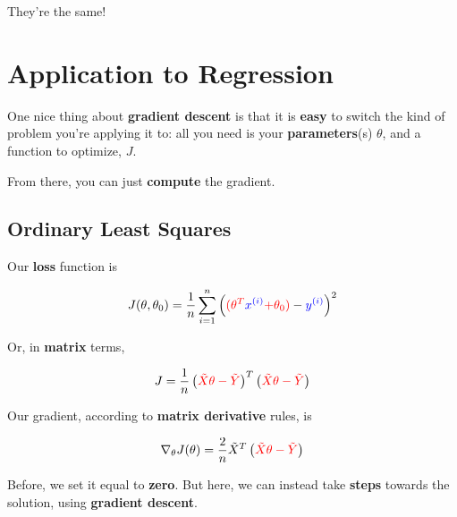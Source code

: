         They're the same!

        

\pagebreak
\section{Application to Regression}
    
    One nice thing about \textbf{gradient descent} is that it is \textbf{easy} to switch the kind of problem you're applying it to: all you need is your \textbf{parameters}(s) $\theta$, and a function to optimize, $J$.
    
    From there, you can just \textbf{compute} the gradient.

    \subsection{Ordinary Least Squares}
        
        Our \textbf{loss} function is
        
        \begin{equation}
            J(\theta,\theta_0) = 
            \frac{1}{n}  \sum_{i=1}^n 
            \left( \textcolor{red}{ (\theta^T} \textcolor{blue}{x^{(i)}} \textcolor{red}{ + \theta_0) } 
            - \textcolor{blue}{y^{(i)}} \right)^2 
        \end{equation}
            
        Or, in \textbf{matrix} terms,
        
        \begin{equation*}
            J = \frac{1}{n}
                \left( \textcolor{red}{ \tilde{X} \theta  - \tilde{Y} } \right)^T
                \left( \textcolor{red}{ \tilde{X} \theta  - \tilde{Y} } \right) 
        \end{equation*}
        
        Our gradient, according to \textbf{matrix derivative} rules, is
        
        \begin{equation}
            \nabla_\theta J(\theta) = 
                \frac{2}{n} \tilde{X}^T
                \left( \textcolor{red}{ \tilde{X} \theta  - \tilde{Y} } \right) 
        \end{equation}
        
        Before, we set it equal to \textbf{zero}. But here, we can instead take \textbf{steps} towards the solution, using \textbf{gradient descent}.
        
